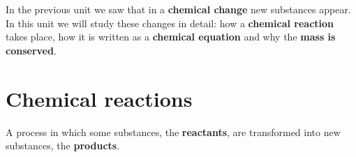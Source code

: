 %
%

\raggedbottom %

In the previous unit we saw that in a \textbf{chemical change} new substances appear. In this unit we will study these changes in detail: how a \textbf{chemical reaction} takes place, how it is written as a \textbf{chemical equation} and why the \textbf{mass is conserved}.

\section{Chemical reactions}

\begin{definition}
    A process in which some substances, the \textbf{reactants}, are transformed into new substances, the \textbf{products}.
\end{definition}

